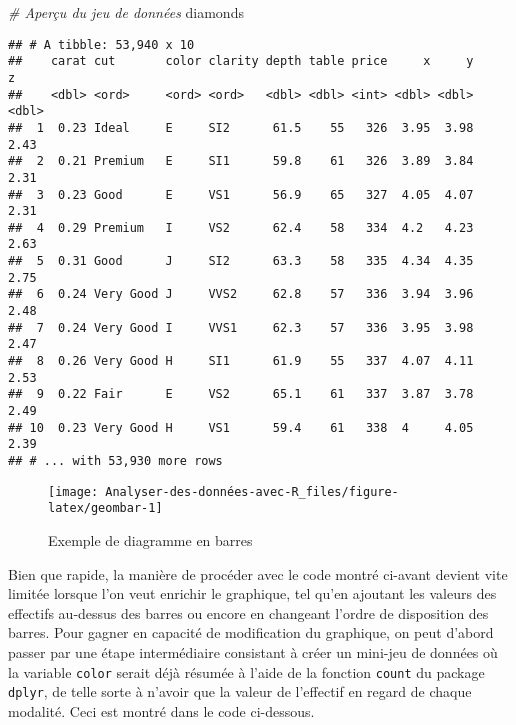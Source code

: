 \documentclass[
  french,
]{book}
\newenvironment{Shaded}{\begin{snugshade}}{\end{snugshade}}
\newcommand{\CommentTok}[1]{\textcolor[rgb]{0.56,0.35,0.01}{\textit{#1}}}
\newcommand{\DataTypeTok}[1]{\textcolor[rgb]{0.13,0.29,0.53}{#1}}
\newcommand{\KeywordTok}[1]{\textcolor[rgb]{0.13,0.29,0.53}{\textbf{#1}}}
\newcommand{\NormalTok}[1]{#1}
\newcommand{\OperatorTok}[1]{\textcolor[rgb]{0.81,0.36,0.00}{\textbf{#1}}}
\newcommand{\StringTok}[1]{\textcolor[rgb]{0.31,0.60,0.02}{#1}}
\begin{document}
\begin{Shaded}
\begin{Highlighting}[]
\CommentTok{# Aperçu du jeu de données}
\NormalTok{diamonds}
\end{Highlighting}
\end{Shaded}

\begin{verbatim}
## # A tibble: 53,940 x 10
##    carat cut       color clarity depth table price     x     y     z
##    <dbl> <ord>     <ord> <ord>   <dbl> <dbl> <int> <dbl> <dbl> <dbl>
##  1  0.23 Ideal     E     SI2      61.5    55   326  3.95  3.98  2.43
##  2  0.21 Premium   E     SI1      59.8    61   326  3.89  3.84  2.31
##  3  0.23 Good      E     VS1      56.9    65   327  4.05  4.07  2.31
##  4  0.29 Premium   I     VS2      62.4    58   334  4.2   4.23  2.63
##  5  0.31 Good      J     SI2      63.3    58   335  4.34  4.35  2.75
##  6  0.24 Very Good J     VVS2     62.8    57   336  3.94  3.96  2.48
##  7  0.24 Very Good I     VVS1     62.3    57   336  3.95  3.98  2.47
##  8  0.26 Very Good H     SI1      61.9    55   337  4.07  4.11  2.53
##  9  0.22 Fair      E     VS2      65.1    61   337  3.87  3.78  2.49
## 10  0.23 Very Good H     VS1      59.4    61   338  4     4.05  2.39
## # ... with 53,930 more rows
\end{verbatim}

\begin{Shaded}
\end{Shaded}

\begin{figure}

{\centering \texttt{[image: Analyser-des-données-avec-R\_files/figure-latex/geombar-1]} 

}

\caption{Exemple de diagramme en barres}\label{fig:geombar}
\end{figure}

Bien que rapide, la manière de procéder avec le code montré ci-avant devient vite limitée lorsque l'on veut enrichir le graphique, tel qu'en ajoutant les valeurs des effectifs au-dessus des barres ou encore en changeant l'ordre de disposition des barres. Pour gagner en capacité de modification du graphique, on peut d'abord passer par une étape intermédiaire consistant à créer un mini-jeu de données où la variable \texttt{color} serait déjà résumée à l'aide de la fonction \texttt{count} du package \texttt{dplyr}, de telle sorte à n'avoir que la valeur de l'effectif en regard de chaque modalité. Ceci est montré dans le code ci-dessous.
\end{document}

